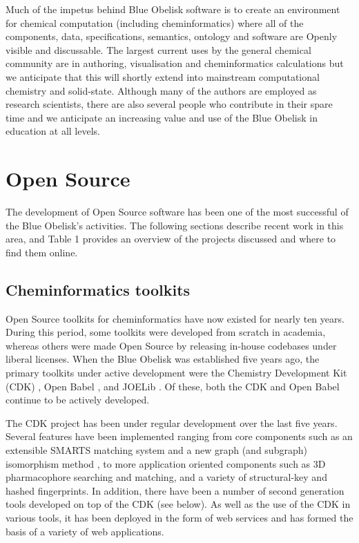 \documentclass[10pt]{bmc_article}
\newenvironment{bmcformat}{\fussy\setboolean{publ}{true}}{\fussy}
\begin{document}
\begin{bmcformat}
Much of the impetus behind Blue Obelisk software is to create an
environment for chemical computation (including cheminformatics) where
all of the components, data, specifications, semantics, ontology and
software are Openly visible and discussable. The largest current uses
by the general chemical community are in authoring, visualisation and
cheminformatics calculations but we anticipate that this will shortly
extend into mainstream computational chemistry and solid-state.
Although many of the authors are employed as research scientists,
there are also several people who contribute in their spare time and
we anticipate an increasing value and use of the Blue Obelisk in
education at all levels.


\section*{Open Source}

The development of Open Source software has been one of the most
successful of the Blue Obelisk's activities. The following sections
describe recent work in this area, and Table 1
provides an overview of the projects
discussed and where to find them online.

\subsection*{Cheminformatics toolkits}

Open Source toolkits for cheminformatics have now existed for nearly
ten years. During this period, some toolkits were developed from
scratch in academia, whereas others were made Open Source by releasing in-house
codebases under liberal licenses. When the Blue Obelisk was
established five years ago, the primary toolkits under active development
were the Chemistry Development Kit (CDK)
\cite{Steinbeck2003, Steinbeck2006}, Open Babel \cite{WebOpen Babel},
and JOELib \cite{WebJOELib}. Of these, both the CDK and Open Babel
continue to be actively developed.

The CDK project has been under regular development over the last five
years. Several features have been implemented ranging from core
components such as an extensible SMARTS matching system and a new graph
(and
subgraph) isomorphism method \cite{smsd}, to more application oriented
components such as 3D pharmacophore searching and matching, and a variety
of structural-key and hashed fingerprints. In addition, there have
been a number of second generation tools developed on top of the CDK
(see below). As well as the use of the CDK in various tools, it has been deployed in
the form of web services \cite{Dong:2007aa} and has formed the basis
of a variety of web applications.


\end{bmcformat}
\end{document}
